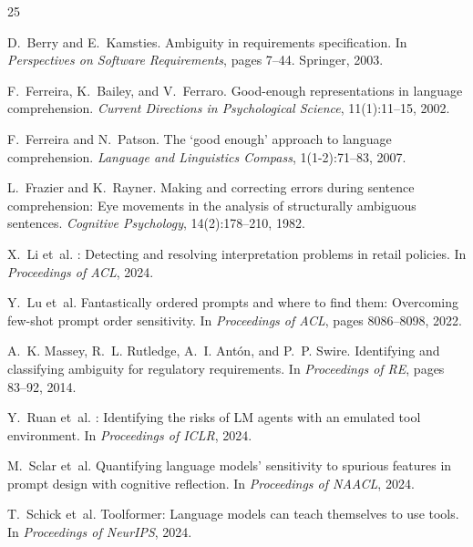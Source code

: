 \documentclass[11pt]{article}
\begin{document}
\begin{thebibliography}{25}

D.~Berry and E.~Kamsties.
\newblock Ambiguity in requirements specification.
\newblock In \emph{Perspectives on Software Requirements}, pages 7--44. Springer, 2003.

F.~Ferreira, K.~Bailey, and V.~Ferraro.
\newblock Good-enough representations in language comprehension.
\newblock \emph{Current Directions in Psychological Science}, 11(1):11--15, 2002.

F.~Ferreira and N.~Patson.
\newblock The `good enough' approach to language comprehension.
\newblock \emph{Language and Linguistics Compass}, 1(1-2):71--83, 2007.

L.~Frazier and K.~Rayner.
\newblock Making and correcting errors during sentence comprehension: Eye movements in the analysis of structurally ambiguous sentences.
\newblock \emph{Cognitive Psychology}, 14(2):178--210, 1982.

X.~Li et~al.
: Detecting and resolving interpretation problems in retail policies.
\newblock In \emph{Proceedings of ACL}, 2024.

Y.~Lu et~al.
\newblock Fantastically ordered prompts and where to find them: Overcoming few-shot prompt order sensitivity.
\newblock In \emph{Proceedings of ACL}, pages 8086--8098, 2022.

A.~K. Massey, R.~L. Rutledge, A.~I. Ant{\'o}n, and P.~P. Swire.
\newblock Identifying and classifying ambiguity for regulatory requirements.
\newblock In \emph{Proceedings of RE}, pages 83--92, 2014.

Y.~Ruan et~al.
: Identifying the risks of {LM} agents with an emulated tool environment.
\newblock In \emph{Proceedings of ICLR}, 2024.

M.~Sclar et~al.
\newblock Quantifying language models' sensitivity to spurious features in prompt design with cognitive reflection.
\newblock In \emph{Proceedings of NAACL}, 2024.

T.~Schick et~al.
\newblock Toolformer: Language models can teach themselves to use tools.
\newblock In \emph{Proceedings of NeurIPS}, 2024.


\end{thebibliography}
\end{document}
